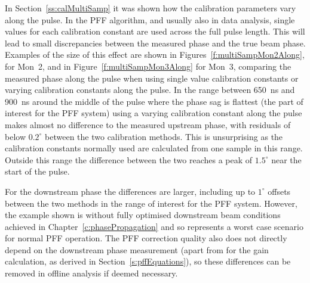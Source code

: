 
In Section~\ref{ss:calMultiSamp} it was shown how the calibration parameters vary along the pulse. In the PFF algorithm, and usually also in data analysis, single values for each calibration constant are used across the full pulse length. This will lead to small discrepancies between the measured phase and the true beam phase. Examples of the size of this effect are shown in Figures~\ref{f:multiSampMon2Along}, for Mon~2, and in Figure~\ref{f:multiSampMon3Along} for Mon~3, comparing the measured phase along the pulse when using single value calibration constants or varying calibration constants along the pulse. In the range between 650~ns and 900~ns around the middle of the pulse where the phase sag is flattest (the part of interest for the PFF system) using a varying calibration constant along the pulse makes almost no difference to the measured upstream phase, with residuals of below \(0.2^\circ\) between the two calibration methods. This is unsurprising as the calibration constants normally used are calculated from one sample in this range. Outside this range the difference between the two reaches a peak of \(1.5^\circ\) near the start of the pulse.

For the downstream phase the differences are larger, including up to \(1^\circ\) offsets between the two methods in the range of interest for the PFF system. However, the example shown is without fully optimised downstream beam conditions achieved in Chapter~\ref{c:phasePropagation} and so represents a worst case scenario for normal PFF operation. The PFF correction quality also does not directly depend on the downstream phase measurement (apart from for the gain calculation, as derived in Section~\ref{s:pffEquations}), so these differences can be removed in offline analysis if deemed necessary.



